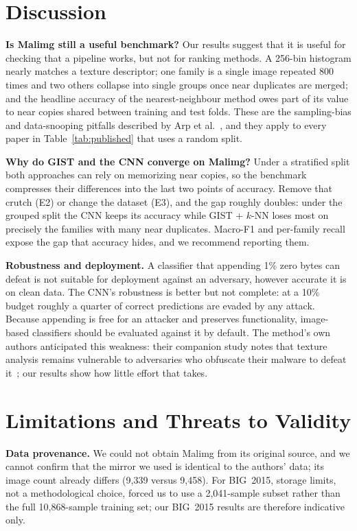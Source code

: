 \documentclass[conference]{IEEEtran}
\begin{document}
\section{Discussion}
\textbf{Is Malimg still a useful benchmark?} Our results suggest that it is useful
for checking that a pipeline works, but not for ranking methods. A 256-bin histogram
nearly matches a texture descriptor; one family is a single image repeated 800 times
and two others collapse into single groups once near duplicates are merged; and the
headline accuracy of the nearest-neighbour method owes part of its value to near
copies shared between training and test folds. These are the sampling-bias and
data-snooping pitfalls described by Arp et al.~\cite{arp2022dos}, and they apply to
every paper in Table~\ref{tab:published} that uses a random split.

\textbf{Why do GIST and the CNN converge on Malimg?} Under a stratified split both
approaches can rely on memorizing near copies, so the benchmark compresses their
differences into the last two points of accuracy. Remove that crutch (E2) or change
the dataset (E3), and the gap roughly doubles: under the grouped split the CNN keeps
its accuracy while GIST + $k$-NN loses most on precisely the families with many near
duplicates. Macro-F1 and
per-family recall expose the gap that accuracy hides, and we recommend reporting them.

\textbf{Robustness and deployment.} A classifier that appending 1\% zero bytes can
defeat is not suitable for deployment against an adversary, however accurate it is on
clean data. The CNN's robustness is better but not complete: at a 10\% budget roughly a
quarter of correct predictions are evaded by any attack. Because appending is free for
an attacker and preserves functionality, image-based classifiers should be evaluated
against it by default. The method's own authors anticipated this weakness: their
companion study notes that texture analysis remains vulnerable to adversaries who
obfuscate their malware to defeat it~\cite{nataraj2011comparative}; our results show
how little effort that takes.

\section{Limitations and Threats to Validity}
\textbf{Data provenance.} We could not obtain Malimg from its original source, and we
cannot confirm that the mirror we used is identical to the authors' data; its image
count already differs (9,339 versus 9,458). For BIG~2015, storage limits, not a
methodological choice, forced us to use a 2,041-sample subset rather than the full
10,868-sample training set; our BIG~2015 results are therefore indicative only.
\end{document}

